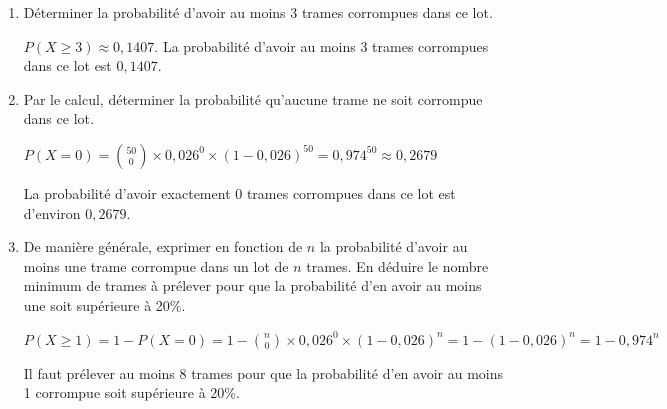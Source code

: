     \begin{enumerate}[resume=monDS]
        \item Déterminer la probabilité d'avoir au moins 3 trames corrompues dans ce lot.
    \begin{blocvisiblex}[height=1]
    {\quad}
    $P(X\geq 3)\approx 0,1407$.    La probabilité d'avoir au moins 3 trames corrompues dans ce lot est  $0,1407$.
    \end{blocvisiblex}
   

\thispagestyle{DS_LP}
    \item Par le calcul, déterminer la probabilité qu'aucune trame ne soit corrompue dans ce lot.
    \begin{blocvisiblex}[height=1.5]
    {\quad}
    $P(X=0)=\binom{50}{0} \times 0,026^0 \times (1-0,026)^{50} = 0,974^{50} \approx 0,2679$

        \smallskip  
    La probabilité d'avoir exactement 0 trames corrompues dans ce lot est d'environ $0,2679$.
    \end{blocvisiblex}
    \medskip
    \item De manière générale, exprimer en fonction de $n$ la probabilité d'avoir au moins une trame corrompue dans un lot de $n$ trames. En déduire le nombre minimum de trames à prélever pour que la probabilité d'en avoir au moins une soit supérieure à 20\%.
    \begin{blocvisiblex}[height=2]
    {\quad}
    $P(X\geq 1)=1-P(X=0)=1-\binom{n}{0} \times 0,026^0 \times (1-0,026)^n = 1-(1-0,026)^n=1-0,974^n$  

    Il faut prélever au moins 8 trames pour que la probabilité d'en avoir au moins 1 corrompue soit supérieure à 20\%.
    \end{blocvisiblex}
     \end{enumerate}
